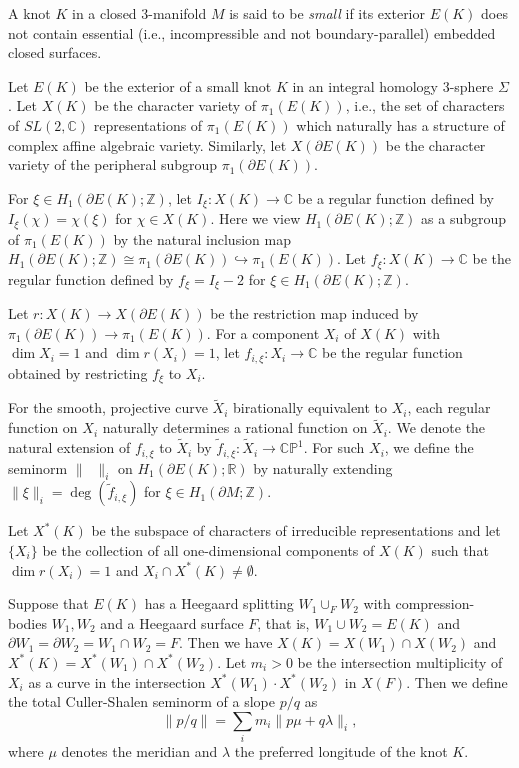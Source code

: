 \documentclass{amsart}
\theoremstyle{remark}
\theoremstyle{definition}
\begin{document}
A knot $K$ in a closed 3-manifold $M$ is said to be \textit{small} if its exterior $E(K)$ does not contain essential 
(i.e., incompressible and not boundary-parallel) embedded closed surfaces. 

Let $E(K)$ be the exterior of a small knot $K$ in an integral homology 3-sphere $\Sigma$. 
Let $X(K)$ be the character variety of $\pi_1 (E(K))$, i.e., the set of characters of $SL (2, \mathbb{C})$ representations of $\pi_1 (E(K))$ which naturally has a structure of complex affine algebraic variety. 
Similarly, let $X(\partial E(K))$ be the character variety of the peripheral subgroup $\pi_{1}(\partial E(K))$.

For $\xi \in H_{1}(\partial E(K);\mathbb{Z})$, let $I_{\xi} : X(K) \to \mathbb{C}$ be a regular function defined by $I_{\xi}(\chi)=\chi(\xi)$ for $\chi \in X(K)$. Here we view $H_{1}(\partial E(K); \mathbb{Z})$ as a subgroup of $\pi_1(E(K))$ by the natural inclusion map $H_{1}(\partial E(K); \mathbb{Z})\cong \pi_{1}(\partial E(K)) \hookrightarrow \pi_1(E(K))$. Let $f_\xi\colon X(K) \to \mathbb{C}$ be the regular function defined by $f_\xi  = I_{\xi} -2$ for $\xi \in H_1(\partial E(K); \mathbb{Z})$. 

Let $r\colon X(K)\to X(\partial E(K))$ be the restriction map induced by $\pi_1(\partial E(K)) \to \pi_1(E(K))$. 
For a component $X_i$ of $X(K)$ with $\dim X_i =1$ and $\dim r(X_i) =1$, 
let $f_{i,\xi}\colon X_i \to \mathbb{C}$ be the regular function obtained by restricting $f_{\xi}$ to $X_i$. 

For the smooth, projective curve $\widetilde{X}_i$ birationally equivalent to $X_i$, each regular function on $X_i$ naturally %
determines a rational function on $\widetilde{X}_i$. 
We denote the natural extension of $f_{i,\xi}$ to $\widetilde{X}_i$ by $\tilde{f}_{i, \xi}\colon \widetilde{X}_i \to \mathbb{C} \mathbb{P}^1$. 
For such $X_i$, 
we define the seminorm  $\| \;\; \|_{i}$ on $H_1(\partial E(K); \mathbb{R})$ by naturally extending 
$ \| \xi \|_{i} =  \deg( \tilde{f}_{i,\xi}) $ for $\xi \in H_1(\partial M; \mathbb{Z})$. 


Let $X^* (K)$ be the subspace of characters of irreducible representations and let $\{X_i\}$ be the collection of all one-dimensional components of $X(K)$ such that $\dim r(X_i) =1$ and $X_i \cap X^*(K) \ne \emptyset$. 

Suppose that $E(K)$ has a Heegaard splitting $W_1 \cup_F W_2$ 
with compression-bodies $W_1 , W_2$ and a Heegaard surface $F$, 
that is, $W_1 \cup W_2 = E(K)$ and $\partial W_1 = \partial W_2 = W_1 \cap W_2 = F$. 
Then we have $X (K) = X (W_1) \cap X (W_2) $ and $X^* (K) = X^* (W_1) \cap X^* (W_2) $. 
Let $m_i > 0$ be the intersection multiplicity of $X_i$ 
as a curve in the intersection $X^* (W_1) \cdot X^* (W_2)$ in $X(F)$.
Then we define the total Culler-Shalen seminorm of a slope $p/q$ as 
$$\| p/q \| =  \sum_i m_i \| p\mu + q \lambda \|_{i},$$ 
where $\mu$ denotes the meridian and $\lambda$ the preferred longitude of the knot $K$.
\end{document}
